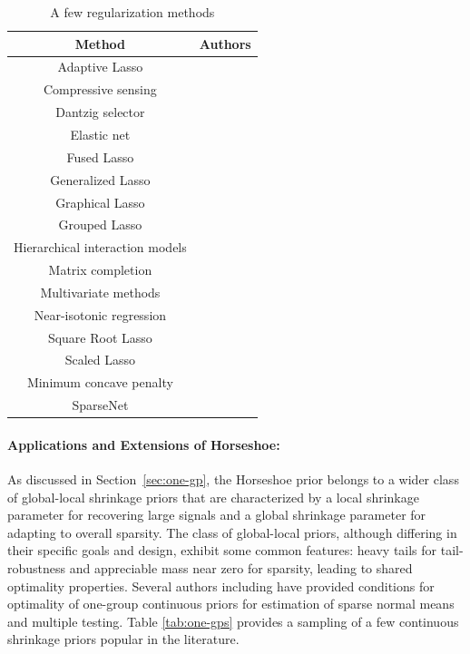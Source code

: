 \documentclass[11pt]{article}
\begin{document}
\begin{table}[ht!]
  \centering
  \caption{A few regularization methods}
  \footnotesize{
    \begin{tabular}{|c|c|}
    \hline
    Method  & Authors  \bigstrut\\
    \hline
    Adaptive Lasso & \citet{zou2006adaptive} \bigstrut[t]\\
    Compressive sensing  & \citet{donoho2006compressed,candes2008restricted} \\
    Dantzig selector  & \citet{candes2007dantzig} \\
    Elastic net & \citet{zou2005regularization} \\
    Fused Lasso & \citet{tibshirani2005sparsity} \\
    Generalized Lasso & \citet{tibshirani2011solution} \\
    Graphical Lasso & \citet{friedman2008sparse} \\
    Grouped Lasso & \citet{yuan2006model} \\
    Hierarchical interaction models & \citet{bien2013lasso} \\
    Matrix completion & \citet{candes2010power,mazumder2010spectral} \\
    Multivariate methods & \citet{jolliffe2003modified,witten2009penalized} \\
    Near-isotonic regression & \citet{tibshirani2011nearly} \\
    Square Root Lasso  & \citet{belloni2011square} \\
    Scaled Lasso & \citet{sun2012scaled} \\
    Minimum concave penalty & \citet{zhang2010nearly} \\
    SparseNet & \citet{mazumder2012} \bigstrut[b]\\
    \hline
    \end{tabular}%
    }
  \label{tab:lasso:ext}%
\end{table}%

\paragraph{Applications and Extensions of Horseshoe:}

As discussed in Section~\ref{sec:one-gp}, the Horseshoe prior belongs to a wider class of global-local shrinkage priors \citep{polson2010shrink} that are characterized by a local shrinkage parameter for recovering large signals and a global shrinkage parameter for adapting to overall sparsity. The class of global-local priors, although differing in their specific goals and design, exhibit some common features: heavy tails for tail-robustness and appreciable mass near zero for sparsity, leading to shared optimality properties. Several authors including \citet{van2015conditions, ghosh2016asymptotic, ghosh2016testing} have provided conditions for optimality of one-group continuous priors for estimation of sparse normal means and multiple testing. Table \ref{tab:one-gps} provides a sampling of a few continuous shrinkage priors popular in the literature. 
\end{document}
